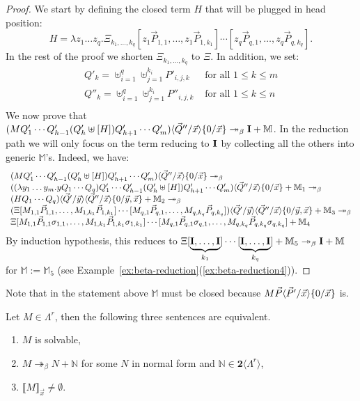 \documentclass{LMCS}
\newcommand{\bool}{\mathbf{2}}
\newcommand{\lam}{\ensuremath{\lambda}}
\newcommand{\Set}[1]{\Lambda^{#1}}
\newcommand{\sums}[1]{\bool\langle\Set{#1}\rangle}
\newcommand{\msto}{\twoheadrightarrow}
\newcommand{\subst}[2]{\{ #2 / #1 \}}	\newcommand{\dg}[2]{\mathrm{deg}_{#1}(#2)} \newcommand{\obsle}{\sqsubseteq_{\mathcal{O}}}
\newcommand{\Int}[1]{\llbracket #1\rrbracket} \newcommand{\trm}[1]{#1^{\textrm{--}}}
\newcommand{\mcup}{\uplus}
\newcommand{\ass}{:=}
\newcommand{\seq}[1]{\vec{#1}}
\newcommand{\sM}{\mathbb{M}}
\newcommand{\sN}{\mathbb{N}}
\newcommand{\gb}{\beta}
\begin{document}
\begin{proof}
We start by defining the closed term $H$ that will be plugged in head position:
$$
	H = \lam z_1\dots z_q.\Xi_{k_1,\ldots,k_q}[z_1\seq P_{1,1},\dots,z_1\seq P_{1,k_1}]\cdots[z_q\seq P_{q,1},\dots,z_q\seq P_{q,k_q}].
$$
In the rest of the proof we shorten $\Xi_{k_1,\ldots,k_q}$ to $\Xi$.
In addition, we set:
$$
\begin{array}{ll}
Q'_k = \mcup^q_{i = 1} \mcup^{k_i}_{j = 1} P'_{i,j,k}&\textrm{ for all }1\le k \le m\\
Q''_k = \mcup^q_{i = 1} \mcup^{k_i}_{j = 1} P''_{i,j,k}&\textrm{ for all }1\le k \le n\\
\end{array}
$$
We now prove that $(MQ'_1\cdots Q'_{h-1}(Q'_{h}\mcup [H])Q'_{h+1} \cdots Q'_m) \lsubst{\seq x}{\seq Q''}\subst{\seq x}{0}\msto_\gb \bold{I} + \sM$. In the reduction path we will only focus on the term reducing to $\bold{I}$ by collecting all the others into generic $\sM$'s.
Indeed, we have:
$$
\begin{array}{l}
(MQ'_1\cdots Q'_{h-1}(Q'_{h}\mcup [H])Q'_{h+1} \cdots Q'_m) \lsubst{\seq x}{\seq Q''}\subst{\seq x}{0}\msto_\gb\\
((\lam y_1\dots y_m.y Q_1\cdots Q_q)Q'_1\cdots Q'_{h-1}(Q'_{h}\mcup [H])Q'_{h+1} \cdots Q'_m) \lsubst{\seq x}{\seq Q''}\subst{\seq x}{0} + \sM_1\msto_\gb\\
(HQ_1\cdots Q_q)\lsubst{\seq y}{\seq Q'}\lsubst{\seq x}{\seq Q''}\subst{\seq y,\seq x}{0} + \sM_2\msto_\gb\\
(\Xi [M_{1,1}\seq P_{1,1},\dots,M_{1,k_1}\seq P_{1,k_1}]\cdots[M_{q,1}\seq P_{q,1},\dots,M_{q,k_q}\seq P_{q,k_q}])\lsubst{\seq y}{\seq Q'}\lsubst{\seq x}{\seq Q''}\subst{\seq y,\seq x}{0} + \sM_3\msto_\gb\\
\Xi [M_{1,1}\seq P_{1,1}\sigma_{1,1},\dots,M_{1,k_1}\seq P_{1,k_1}\sigma_{1,k_1}]\cdots[M_{q,1}\seq P_{q,1}\sigma_{q,1},\dots,M_{q,k_q}\seq P_{q,k_q}\sigma_{q,k_q}] + \sM_4\\
\end{array}
$$
By induction hypothesis, this reduces to $\Xi [\underbrace{\bold{I},\dots,\bold{I}}_{k_1}]\cdots[\underbrace{\bold{I},\dots,\bold{I}}_{k_q}] + \sM_5\msto_\gb \bold{I} + \sM$ for $\sM \ass \sM_5$ (see Example~\ref{ex:beta-reduction}(\ref{ex:beta-reduction4})).
\end{proof}

Note that in the statement above $\sM$ must be closed because $M\seq P\lsubst{\seq x}{\seq P'}\subst{\seq x}{0}$ is.


\begin{thm}\label{thm:equivalence-solvable-normalizable}
Let $M\in\Set{r}$, then the following three sentences are equivalent.
\begin{enumerate}[\em(i)]
\item\label{thm:equivalence-solvable-normalizable1} 
	$M$ is solvable,
\item\label{thm:equivalence-solvable-normalizable2} 
	$M \msto_\gb N + \sN$ for some $N$ in normal form and $\sN\in\sums{r}$,
\item\label{thm:equivalence-solvable-normalizable3} 
	$\Int{M}_{\seq x}\neq\emptyset$.
\end{enumerate}
\end{thm}
\end{document}
